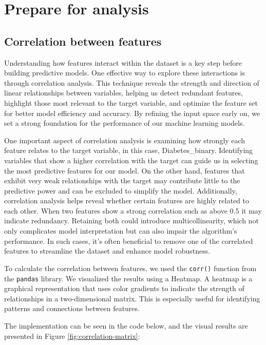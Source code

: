 \section{Prepare for analysis}

\subsection{Correlation between features}

Understanding how features interact within the dataset is a key step before building predictive models. One effective way to explore these interactions is through correlation analysis. This technique reveals the strength and direction of linear relationships between variables, helping us detect redundant features, highlight those most relevant to the target variable, and optimize the feature set for better model efficiency and accuracy. By refining the input space early on, we set a strong foundation for the performance of our machine learning models.

One important aspect of correlation analysis is examining how strongly each feature relates to the target variable, in this case, Diabetes\_binary. Identifying variables that show a higher correlation with the target can guide us in selecting the most predictive features for our model. On the other hand, features that exhibit very weak relationships with the target may contribute little to the predictive power and can be excluded to simplify the model. Additionally, correlation analysis helps reveal whether certain features are highly related to each other. When two features show a strong correlation such as above 0.5 it may indicate redundancy. Retaining both could introduce multicollinearity, which not only complicates model interpretation but can also impair the algorithm’s performance. In such cases, it's often beneficial to remove one of the correlated features to streamline the dataset and enhance model robustness.

To calculate the correlation between features, we used the \texttt{corr()} function from the \texttt{pandas} library.  
We visualized the results using a Heatmap. A heatmap is a graphical representation that uses color gradients to indicate the strength of relationships in a two-dimensional matrix. This is especially useful for identifying patterns and connections between features.

The implementation can be seen in the code below, and the visual results are presented in Figure \ref{fig:correlation-matrix}:

